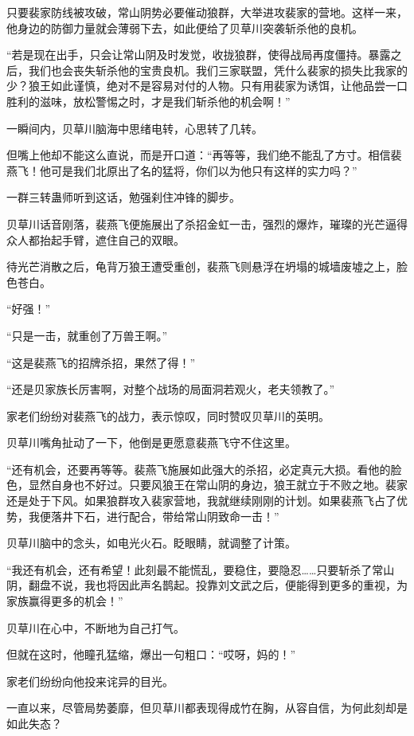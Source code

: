 \begin{this_body}
只要裴家防线被攻破，常山阴势必要催动狼群，大举进攻裴家的营地。这样一来，他身边的防御力量就会薄弱下去，如此便给了贝草川突袭斩杀他的良机。

“若是现在出手，只会让常山阴及时发觉，收拢狼群，使得战局再度僵持。暴露之后，我们也会丧失斩杀他的宝贵良机。我们三家联盟，凭什么裴家的损失比我家的少？狼王如此谨慎，绝对不是容易对付的人物。只有用裴家为诱饵，让他品尝一口胜利的滋味，放松警惕之时，才是我们斩杀他的机会啊！”

一瞬间内，贝草川脑海中思绪电转，心思转了几转。

但嘴上他却不能这么直说，而是开口道：“再等等，我们绝不能乱了方寸。相信裴燕飞！他可是我们北原出了名的猛将，你们以为他只有这样的实力吗？”

一群三转蛊师听到这话，勉强刹住冲锋的脚步。

贝草川话音刚落，裴燕飞便施展出了杀招金虹一击，强烈的爆炸，璀璨的光芒逼得众人都抬起手臂，遮住自己的双眼。

待光芒消散之后，龟背万狼王遭受重创，裴燕飞则悬浮在坍塌的城墙废墟之上，脸色苍白。

“好强！”

“只是一击，就重创了万兽王啊。”

“这是裴燕飞的招牌杀招，果然了得！”

“还是贝家族长厉害啊，对整个战场的局面洞若观火，老夫领教了。”

家老们纷纷对裴燕飞的战力，表示惊叹，同时赞叹贝草川的英明。

贝草川嘴角扯动了一下，他倒是更愿意裴燕飞守不住这里。

“还有机会，还要再等等。裴燕飞施展如此强大的杀招，必定真元大损。看他的脸色，显然自身也不好过。只要风狼王在常山阴的身边，狼王就立于不败之地。裴家还是处于下风。如果狼群攻入裴家营地，我就继续刚刚的计划。如果裴燕飞占了优势，我便落井下石，进行配合，带给常山阴致命一击！”

贝草川脑中的念头，如电光火石。眨眼睛，就调整了计策。

“我还有机会，还有希望！此刻最不能慌乱，要稳住，要隐忍……只要斩杀了常山阴，翻盘不说，我也将因此声名鹊起。投靠刘文武之后，便能得到更多的重视，为家族赢得更多的机会！”

贝草川在心中，不断地为自己打气。

但就在这时，他瞳孔猛缩，爆出一句粗口：“哎呀，妈的！”

家老们纷纷向他投来诧异的目光。

一直以来，尽管局势萎靡，但贝草川都表现得成竹在胸，从容自信，为何此刻却是如此失态？


\end{this_body}
